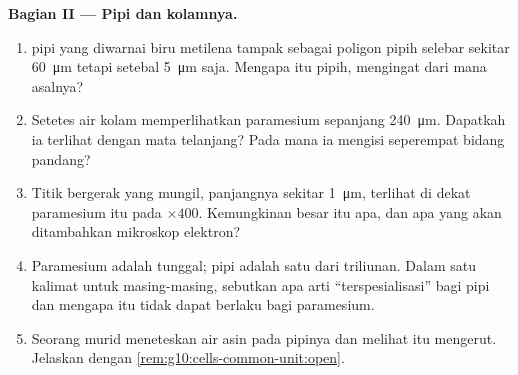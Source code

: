 \begin{problem}
\medskip
\noindent\textbf{Bagian II --- Pipi dan kolamnya.}
\begin{enumerate}[resume]
  \item {} pipi yang diwarnai biru metilena tampak sebagai poligon
        pipih selebar sekitar \qty{60}{\micro m} tetapi setebal
        \qty{5}{\micro m} saja. Mengapa  itu pipih, mengingat dari
        mana asalnya?
  \item Setetes air kolam memperlihatkan paramesium sepanjang
        \qty{240}{\micro m}. Dapatkah ia terlihat dengan mata
        telanjang? Pada  mana ia mengisi seperempat bidang pandang?
  \item Titik bergerak yang mungil, panjangnya sekitar
        \qty{1}{\micro m}, terlihat di dekat paramesium itu pada
        $\times 400$. Kemungkinan besar itu apa, dan apa yang akan
        ditambahkan mikroskop elektron?
  \item Paramesium adalah  tunggal;  pipi adalah satu dari
        triliunan. Dalam satu kalimat untuk masing-masing, sebutkan apa
        arti ``terspesialisasi'' bagi  pipi dan mengapa itu tidak
        dapat berlaku bagi paramesium.
  \item Seorang murid meneteskan air asin pada  pipinya dan melihat
         itu mengerut. Jelaskan dengan
        \cref{rem:g10:cells-common-unit:open}.
\end{enumerate}


\end{problem}
